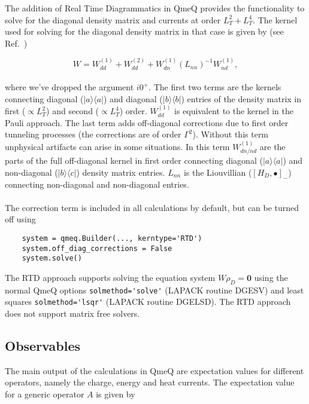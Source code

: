 \documentclass{article}
\newcommand{\oph}[2]{\ensuremath{|#1\rangle\langle#2|}}
\begin{document}
The addition of Real Time Diagrammatics in QmeQ provides the functionality to solve for the diagonal density matrix and currents at order $L_T^2 + L_T^4$. The kernel used for solving for the diagonal density matrix in that case is given by (see Ref.~\cite{leijnse2008kinetic})

\begin{equation}
	W = W_{dd}^{(1)} + W_{dd}^{(2)} + W_{dn}^{(1)}\left(L_{nn}\right)^{-1}W_{nd}^{(1)},
    \label{Eq:Fullkernel}
\end{equation}
\\
where we've dropped the argument $i0^+$. The first two terms are the kernels connecting diagonal ($\oph{a}{a}$) and diagonal ($\oph{b}{b}$) entries of the density matrix in first ($\propto L_T^2$) and second ($\propto L_T^4$) order. $W_{dd}^{(1)}$ is equivalent to the kernel in the Pauli approach. The last term adds off-diagonal corrections due to first order tunneling processes (the corrections are of order $\Gamma^2$). Without this term unphysical artifacts can arise in some situations. In this term $W_{dn/nd}^{(1)}$ are the parts of the full off-diagonal kernel in first order connecting diagonal ($\oph{a}{a}$) and non-diagonal ($\oph{b}{c}$) density matrix entries. $L_{nn}$ is the Liouvillian ($[H_D, \bullet]_-$) connecting non-diagonal and non-diagonal entries.
\\
\\
The correction term is included in all calculations by default, but can be turned off using 

\begin{verbatim}
    system = qmeq.Builder(..., kerntype='RTD') 
    system.off_diag_corrections = False 
    system.solve()
\end{verbatim}
The RTD approach supports solving the equation system $W\rho_D=\mathbf{0}$ using the normal QmeQ options \verb !solmethod='solve'! (LAPACK routine DGESV) and least squares \verb!solmethod='lsqr'! (LAPACK routine DGELSD). The RTD approach does not support matrix free solvers.
\subsection{Observables}
\label{Sec:Observables}

The main output of the calculations in QmeQ are expectation values for different operators, namely the charge, energy and heat currents. The expectation value for a generic operator $A$ is given by 
\end{document}
